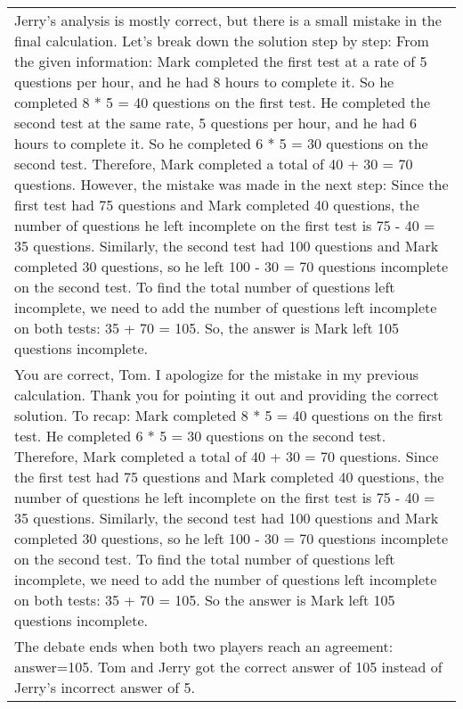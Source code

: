 \begin{table}[ht]
\begin{tabular}{p{13cm}}
\vspace{-1mm}
\begin{minipage}[b]{0.05\columnwidth}
    \centering
    \raisebox{-.1in}{\texttt{[image: icons/player1\_down.png]}}
\end{minipage}
Jerry's analysis is mostly correct, but there is a small mistake in the final calculation. Let's break down the solution step by step: From the given information: Mark completed the first test at a rate of 5 questions per hour, and he had 8 hours to complete it. So he completed 8 * 5 = 40 questions on the first test. He completed the second test at the same rate, 5 questions per hour, and he had 6 hours to complete it. So he completed 6 * 5 = 30 questions on the second test. Therefore, Mark completed a total of 40 + 30 = 70 questions. However, the mistake was made in the next step: Since the first test had 75 questions and Mark completed 40 questions, the number of questions he left incomplete on the first test is 75 - 40 = 35 questions. Similarly, the second test had 100 questions and Mark completed 30 questions, so he left 100 - 30 = 70 questions incomplete on the second test. To find the total number of questions left incomplete, we need to add the number of questions left incomplete on both tests: 35 + 70 = 105. So, the answer is Mark left 105 questions incomplete. \\
\vspace{-1mm}
\begin{minipage}[b]{0.05\columnwidth}
    \centering
    \raisebox{-.1in}{\texttt{[image: icons/player2\_down.png]}}
\end{minipage}
You are correct, Tom. I apologize for the mistake in my previous calculation. Thank you for pointing it out and providing the correct solution. To recap: Mark completed 8 * 5 = 40 questions on the first test. He completed 6 * 5 = 30 questions on the second test. Therefore, Mark completed a total of 40 + 30 = 70 questions. Since the first test had 75 questions and Mark completed 40 questions, the number of questions he left incomplete on the first test is 75 - 40 = 35 questions. Similarly, the second test had 100 questions and Mark completed 30 questions, so he left 100 - 30 = 70 questions incomplete on the second test. To find the total number of questions left incomplete, we need to add the number of questions left incomplete on both tests: 35 + 70 = 105. So the answer is Mark left 105 questions incomplete. \\
\midrule
The debate ends when both two players reach an agreement: answer=105.
Tom and Jerry got the correct answer of 105 instead of Jerry's incorrect answer of 5. \\
\bottomrule
\end{tabular}
\end{table}


